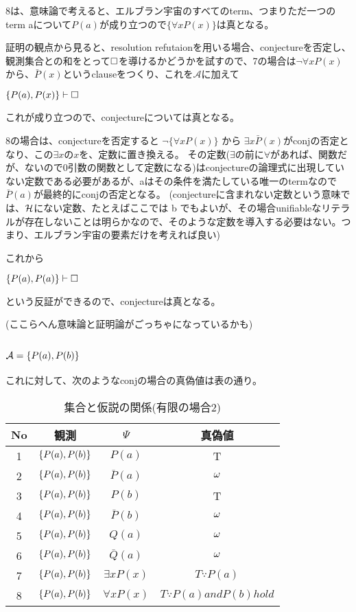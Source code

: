 \documentclass[10pt, oneside]{jarticle}   	%
\begin{document}
8は、意味論で考えると、エルブラン宇宙のすべてのterm、つまりただ一つのterm aについて$P(a)$が成り立つので$\{\forall x P(x)\}$は真となる。

証明の観点から見ると、resolution refutaionを用いる場合、conjectureを否定し、観測集合との和をとって$\Box$を導けるかどうかを試すので、7の場合は$\neg \forall x P(x)$から、$\bar P(x)$というclauseをつくり、これを$\mathcal{A}$に加えて

$\{P(a), P(x)\} \vdash \Box$ 

これが成り立つので、conjectureについては真となる。

8の場合は、conjectureを否定すると $\neg \{\forall x P(x)\}$ から $\exists x \bar P(x)$がconjの否定となり、この$\exists x$の$x$を、定数に置き換える。
その定数($\exists$の前に$\forall$があれば、関数だが、ないので0引数の関数として定数になる)はconjectureの論理式に出現していない定数である必要があるが、aはその条件を満たしている唯一のtermなので $\bar P(a)$が最終的にconjの否定となる。
(conjectureに含まれない定数という意味では、$\mathcal{H}$にない定数、たとえばここでは b でもよいが、その場合unifiableなリテラルが存在しないことは明らかなので、そのような定数を導入する必要はない。つまり、エルブラン宇宙の要素だけを考えれば良い)

これから

$\{{P(a), P(a)}\} \vdash \Box$ 

という反証ができるので、conjectureは真となる。

(ここらへん意味論と証明論がごっちゃになっているかも)


\subsection{$\mathcal{A}=\{{P(a), P(b)}\}$}
これに対して、次のようなconjの場合の真偽値は表の通り。

\begin{table}[htbp]
 \centering
 \begin{tabular}{|c|c|c|c|}\hline
   No & 観測 & $\Psi$ & 真偽値 \\ \hline
   1 & $\{{P(a), P(b)}\}$ & $P(a)$ & T \\ \hline
   2 & $\{{P(a), P(b)}\}$ & $\bar P(a)$ & $\omega$  \\ \hline
   3 & $\{{P(a), P(b)}\}$ & $P(b)$ & T \\ \hline
   4 & $\{{P(a), P(b)}\}$ & $\bar P(b)$ & $\omega$  \\ \hline
   5 & $\{{P(a), P(b)}\}$ & $Q(a)$ & $\omega$ \\ \hline
   6 & $\{{P(a), P(b)}\}$ & $\bar Q(a)$ & $\omega$ \\ \hline
   7 & $\{{P(a), P(b)}\}$ & $\exists x P(x)$ & $T \because P(a)$ \\ \hline
   8 & $\{{P(a), P(b)}\}$ & $\forall x P(x)$ & $T \because  P(a) and P(b) hold$ \\ \hline
 \end{tabular}
 \caption{集合と仮説の関係(有限の場合2)}
 \label{tab:ex0102}
\end{table}
\end{document}
